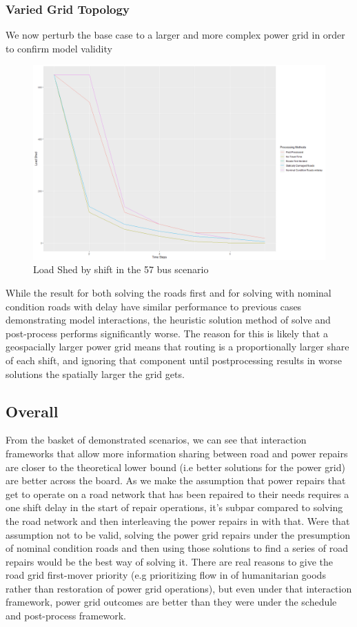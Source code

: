 \documentclass{article}
\begin{document}
	\subsubsection{Varied Grid Topology}
	We now perturb the base case to a larger and more complex power grid in order to confirm model validity 
	\begin{figure}[H]
		\centering
		\includegraphics[width=.9\linewidth]{Rplot57.png}
		\caption{Load Shed by shift in the 57 bus scenario}
		\label{fig:sub2}
		
		
	\end{figure}
	
	While the result for both solving the roads first and for solving with nominal condition roads with delay have similar performance to previous cases demonstrating model interactions, the heuristic solution method of solve and post-process performs significantly worse. The reason for this is likely that a geospacially larger power grid means that routing is a proportionally larger share of each shift, and ignoring that component until postprocessing results in worse solutions the spatially larger the grid gets.
	
	\subsection{Overall}
	From the basket of demonstrated scenarios, we can see that interaction frameworks that allow more information sharing between road and power repairs are closer to the theoretical lower bound (i.e better solutions for the power grid) are better across the board. As we make the assumption that power repairs that get to operate on a road network that has been repaired to their needs requires a one shift delay in the start of repair operations, it's subpar compared to solving the road network and then interleaving the power repairs in with that. Were that assumption not to be valid, solving the power grid repairs under the presumption of nominal condition roads and then using those solutions to find a series of road repairs would be the best way of solving it. There are real reasons to give the road grid first-mover priority (e.g prioritizing flow in of humanitarian goods rather than restoration of power grid operations), but even under that interaction framework, power grid outcomes are better than they were under the schedule and post-process framework.
	
\end{document}
